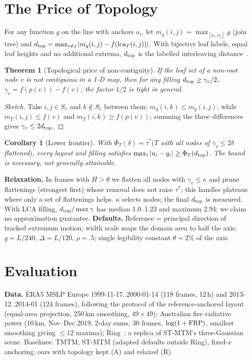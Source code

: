 \documentclass[10pt,twocolumn]{article}
\newtheorem{theorem}{Theorem}\newtheorem{proposition}{Proposition}\newtheorem{corollary}{Corollary}\newtheorem{definition}{Definition}
\begin{document}
\section{The Price of Topology}\label{sec:topo}
For any function $g$ on the line with anchors $a_i$, let $m_g(i,j)=\max_{[a_i,a_j]}g$ (join tree) and $d_{\rm top}=\max_{i\ne j}|m_g(i,j)-f(\mathrm{lca}_T(i,j))|$. With bijective leaf labels, equal leaf heights and no additional extrema, $d_{\rm top}$ is the labelled interleaving distance~\cite{munch2019}.
\begin{theorem}[Topological price of non-contiguity]If the leaf set of a non-root node $v$ is not contiguous in a 1-D map, then for any filling $d_{\rm top}\ge\gamma_v/2$, $\gamma_v=f(p(v))-f(v)$; the factor $1/2$ is tight in general.\end{theorem}
\begin{proof}[Sketch]Take $i,j\in S_v$ and $k\notin S_v$ between them: $m_g(i,k)\le m_g(i,j)$, while $m_T(i,j)\le f(v)$ and $m_T(i,k)\ge f(p(v))$; summing the three differences gives $\gamma_v\le2d_{\rm top}$.\end{proof}
\begin{corollary}[Lower frontier]With $\Phi_T(\delta)=\tau^*(T$ with all nodes of $\gamma_v\le2\delta$ flattened$)$, every layout and filling satisfies $\max_i|u_i-q_i|\ge\Phi_T(d_{\rm top})$. The bound is necessary, not generally attainable.\end{corollary}
\textbf{Relaxation.} In frames with $H>\theta$ we flatten all nodes with $\gamma_v\le\kappa$ and prune flattenings (strongest first) whose removal does not raise $\tau^*$; this handles plateaus where only a set of flattenings helps. $\kappa$ selects nodes; the final $d_{\rm top}$ is measured. With LCA filling, $d_{\rm top}/\max\gamma$ has median 1.0--1.23 and maximum 2.94; we claim no approximation guarantee.
\textbf{Defaults.} Reference = principal direction of tracked extremum motion; width scale maps the domain area to half the axis; $g=L/240$, $\Delta=L/120$, $\rho=.5$; single legibility constant $\theta=2\%$ of the axis.

\section{Evaluation}\label{sec:eval}
\textbf{Data.} ERA5 MSLP Europe 1999-11-17..2000-01-14 (118 frames, 12\,h) and 2013-12..2014-01 (124 frames), following the protocol of the reference-anchored layout (equal-area projection, 250\,km smoothing, $49\times49$); Australian fire radiative power (10\,km, Nov--Dec 2019, 2-day sums, 30 frames, $\log(1+{\rm FRP})$, smallest smoothing giving $\le12$ maxima); Ring~\cite{tmtm,franke2021}; a replica of ST-MTM's three-Gaussian scene. Baselines: TMTM, ST-MTM (adapted defaults outside Ring), fixed-$x$ anchoring; ours with topology kept (A) and relaxed (R).
\end{document}
